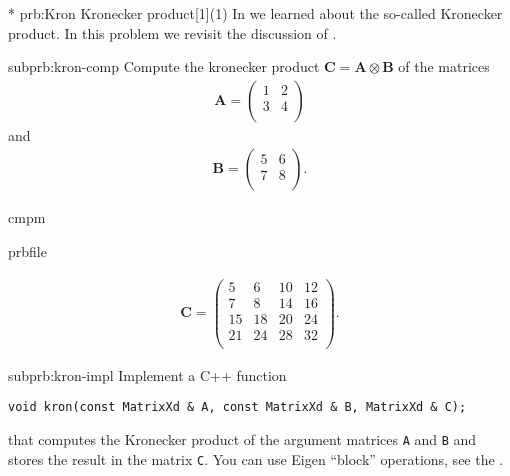 \renewcommand{\ProblemName}{Kronecker}

\begin{samproblem}*
  {prb:Kron}
  {Kronecker product}[1](1)
  {
    In  we learned about the so-called Kronecker product.
    In this problem we revisit the
    discussion of .
  }

\begin{subproblem}{subprb:kron-comp}
  Compute the kronecker product
  $\mathbf{C} = \mathbf{A} \otimes \mathbf{B}$ of the matrices
\begin{align*}
  \mathbf{A} = \begin{pmatrix}
         1 & 2   \\
         3 & 4   \\
       \end{pmatrix}
\end{align*}
and
\begin{align*}
\mathbf{B}=\begin{pmatrix}
         5 & 6   \\
         7 & 8   \\
       \end{pmatrix}.
\end{align*}

\begin{samwriteprbpart}{cmpm}
  \begin{writeverbatim}{prbfile}
    \begin{samsolution}
      \begin{align*}
\mathbf{C}=\begin{pmatrix}
         5 & 6 & 10 & 12  \\
         7 & 8 & 14 & 16  \\
         15 & 18 & 20 & 24  \\
         21 & 24 & 28 & 32  \\
       \end{pmatrix}.
        \end{align*}
      \end{samsolution}
    \end{writeverbatim}
  \end{samwriteprbpart}
\end{subproblem}

\begin{subproblem}{subprb:kron-impl}
Implement a C++ function
\begin{lstlisting}[style=cppsimple]
void kron(const MatrixXd & A, const MatrixXd & B, MatrixXd & C);
\end{lstlisting}
that computes the Kronecker product of the argument matrices
\texttt{A} and \texttt{B} and stores the result in the matrix \texttt{C}.
You can use Eigen ``block'' operations, see the .


\end{subproblem}
\end{samproblem}
